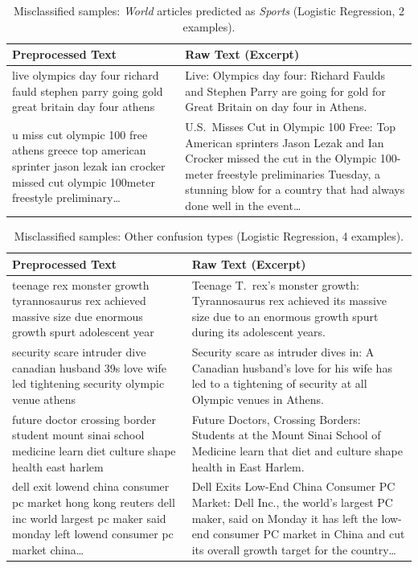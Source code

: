\newpage

\begin{table}[htbp]
\centering
\caption{Misclassified samples: \textit{World} articles predicted as \textit{Sports} (Logistic Regression, 2 examples).}
\label{tab:logreg-world-sports}
\small
\begin{tabular}{p{0.6\textheight} p{0.6\textheight}}
\toprule
\textbf{Preprocessed Text} & \textbf{Raw Text (Excerpt)} \\
\midrule
live olympics day four richard fauld stephen parry going gold great britain day four athens &
Live: Olympics day four: Richard Faulds and Stephen Parry are going for gold for Great Britain on day four in Athens. \\
\addlinespace
u miss cut olympic 100 free athens greece top american sprinter jason lezak ian crocker missed cut olympic 100meter freestyle preliminary\ldots &
U.S.\ Misses Cut in Olympic 100 Free: Top American sprinters Jason Lezak and Ian Crocker missed the cut in the Olympic 100-meter freestyle preliminaries Tuesday, a stunning blow for a country that had always done well in the event\ldots \\
\bottomrule
\end{tabular}
\end{table}

\newpage

\begin{table}[htbp]
\centering
\caption{Misclassified samples: Other confusion types (Logistic Regression, 4 examples).}
\label{tab:logreg-other}
\small
\begin{tabular}{p{0.6\textheight} p{0.6\textheight}}
\toprule
\textbf{Preprocessed Text} & \textbf{Raw Text (Excerpt)} \\
\midrule
teenage rex monster growth tyrannosaurus rex achieved massive size due enormous growth spurt adolescent year &
Teenage T.\ rex's monster growth: Tyrannosaurus rex achieved its massive size due to an enormous growth spurt during its adolescent years. \\
\addlinespace
security scare intruder dive canadian husband 39s love wife led tightening security olympic venue athens &
Security scare as intruder dives in: A Canadian husband's love for his wife has led to a tightening of security at all Olympic venues in Athens. \\
\addlinespace
future doctor crossing border student mount sinai school medicine learn diet culture shape health east harlem &
Future Doctors, Crossing Borders: Students at the Mount Sinai School of Medicine learn that diet and culture shape health in East Harlem. \\
\addlinespace
dell exit lowend china consumer pc market hong kong reuters dell inc world largest pc maker said monday left lowend consumer pc market china\ldots &
Dell Exits Low-End China Consumer PC Market: Dell Inc., the world's largest PC maker, said on Monday it has left the low-end consumer PC market in China and cut its overall growth target for the country\ldots \\
\bottomrule
\end{tabular}
\end{table}